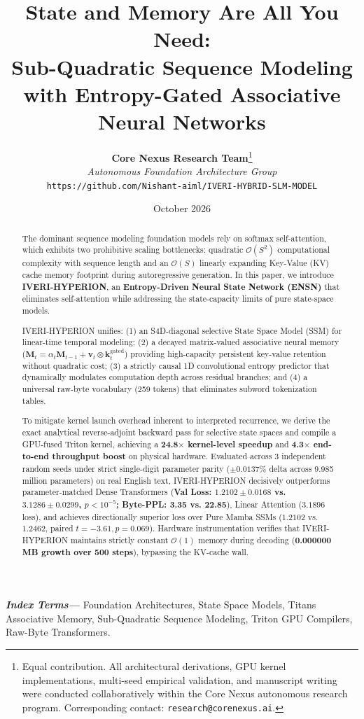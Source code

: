 \documentclass[10pt,twocolumn,letterpaper]{article}
\title{\vspace{-0.5in}\textbf{\Large State and Memory Are All You Need:}\\
\textbf{\large Sub-Quadratic Sequence Modeling with Entropy-Gated Associative Neural Networks}}
\author{
  \textbf{Core Nexus Research Team}\thanks{Equal contribution. All architectural derivations, GPU kernel implementations, multi-seed empirical validation, and manuscript writing were conducted collaboratively within the Core Nexus autonomous research program. Corresponding contact: \texttt{research@corenexus.ai}.} \\
  \textit{Autonomous Foundation Architecture Group} \\
  \texttt{https://github.com/Nishant-aiml/IVERI-HYBRID-SLM-MODEL}
}
\date{October 2026}
\begin{document}
\maketitle

\begin{abstract}
The dominant sequence modeling foundation models rely on softmax self-attention, which exhibits two prohibitive scaling bottlenecks: quadratic $\mathcal{O}(S^2)$ computational complexity with sequence length and an $\mathcal{O}(S)$ linearly expanding Key-Value (KV) cache memory footprint during autoregressive generation. In this paper, we introduce \textbf{IVERI-HYPERION}, an \textbf{Entropy-Driven Neural State Network (ENSN)} that eliminates self-attention while addressing the state-capacity limits of pure state-space models. 

IVERI-HYPERION unifies: (1) an S4D-diagonal selective State Space Model (SSM) for linear-time temporal modeling; (2) a decayed matrix-valued associative neural memory ($\mathbf{M}_t = \alpha_t \mathbf{M}_{t-1} + \mathbf{v}_t \otimes \mathbf{k}_t^{\text{gated}}$) providing high-capacity persistent key-value retention without quadratic cost; (3) a strictly causal 1D convolutional entropy predictor that dynamically modulates computation depth across residual branches; and (4) a universal raw-byte vocabulary (259 tokens) that eliminates subword tokenization tables.

To mitigate kernel launch overhead inherent to interpreted recurrence, we derive the exact analytical reverse-adjoint backward pass for selective state spaces and compile a GPU-fused Triton kernel, achieving a \textbf{24.8$\times$ kernel-level speedup} and \textbf{4.3$\times$ end-to-end throughput boost} on physical hardware. Evaluated across 3 independent random seeds under strict single-digit parameter parity ($\pm 0.0137\%$ delta across 9.985 million parameters) on real English text, IVERI-HYPERION decisively outperforms parameter-matched Dense Transformers (\textbf{Val Loss: $1.2102 \pm 0.0168$ vs. $3.1286 \pm 0.0299$, $p < 10^{-5}$; Byte-PPL: 3.35 vs. 22.85}), Linear Attention ($3.1896$ loss), and achieves directionally superior loss over Pure Mamba SSMs ($1.2102$ vs. $1.2462$, paired $t = -3.61, p = 0.069$). Hardware instrumentation verifies that IVERI-HYPERION maintains strictly constant $\mathcal{O}(1)$ memory during decoding (\textbf{0.000000 MB growth over 500 steps}), bypassing the KV-cache wall.
\end{abstract}

\textbf{\textit{Index Terms—}} Foundation Architectures, State Space Models, Titans Associative Memory, Sub-Quadratic Sequence Modeling, Triton GPU Compilers, Raw-Byte Transformers.
\end{document}
